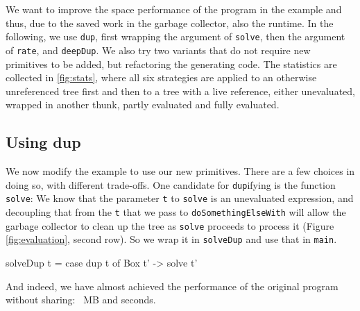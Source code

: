 \documentclass[preprint]{sigplanconf}
\theoremstyle{nonumberplain}
\newcommand{\li}{\lstinline[style=Haskell]}
\begin{document}

We want to improve the space performance of the program in the example and thus, due to the saved work in the garbage collector, also the runtime. In the following, we use \li-dup-, first wrapping the argument of \li-solve-, then the argument of \li-rate-, and \li-deepDup-. We also try two variants that do not require new primitives to be added, but refactoring the generating code. The statistics are collected in \ref{fig:stats}, where all six strategies are applied to an otherwise unreferenced tree first and then to a tree with a live reference, either unevaluated, wrapped in another thunk, partly evaluated and fully evaluated.


\subsection{Using dup}

We now modify the example to use our new primitives. There are a few choices in doing so, with different trade-offs. One candidate for \li-dup-ifying is the function \li-solve-: We know that the parameter \li-t- to \li-solve- is an unevaluated expression, and decoupling that from the \li-t- that we pass to \li-doSomethingElseWith- will allow the garbage collector to clean up the tree as \li-solve- proceeds to process it (Figure \ref{fig:evaluation}, second row). So we wrap it in \li-solveDup- and use that in \li-main-.
\begin{haskell}
solveDup t = case dup t of Box t' -> solve t'
\end{haskell}
And indeed, we have almost achieved the performance of the original program without sharing: ~MB and  seconds.
\end{document}
